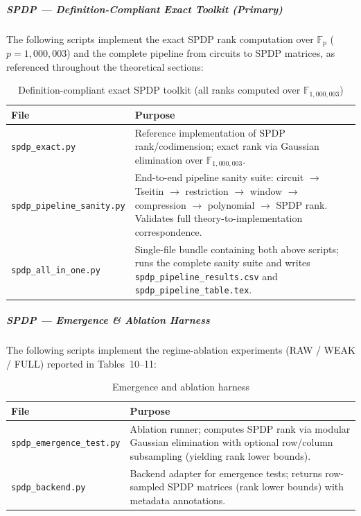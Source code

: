 \documentclass[12pt]{article}
\theoremstyle{definition}
\theoremstyle{definition}
\theoremstyle{remark}
\theoremstyle{remark}
\begin{document}
\subparagraph{SPDP --- Definition-Compliant Exact Toolkit (Primary)}
The following scripts implement the exact SPDP rank computation over $\mathbb{F}_p$ ($p = 1{,}000{,}003$) and the complete pipeline from circuits to SPDP matrices, as referenced throughout the theoretical sections:

\begin{table}[h]
\centering
\footnotesize
\begin{tabular}{p{4cm}p{9.5cm}}
\toprule
\textbf{File} & \textbf{Purpose} \\
\midrule
\texttt{spdp\_exact.py} & Reference implementation of SPDP rank/codimension; exact rank via Gaussian elimination over $\mathbb{F}_{1{,}000{,}003}$. \\
\addlinespace
\texttt{spdp\_pipeline\_sanity.py} & End-to-end pipeline sanity suite: circuit $\to$ Tseitin $\to$ restriction $\to$ window $\to$ compression $\to$ polynomial $\to$ SPDP rank. Validates full theory-to-implementation correspondence. \\
\addlinespace
\texttt{spdp\_all\_in\_one.py} & Single-file bundle containing both above scripts; runs the complete sanity suite and writes \texttt{spdp\_pipeline\_results.csv} and \texttt{spdp\_pipeline\_table.tex}. \\
\bottomrule
\end{tabular}
\caption{Definition-compliant exact SPDP toolkit (all ranks computed over $\mathbb{F}_{1{,}000{,}003}$)}
\label{tab:spdp-exact-toolkit}
\end{table}

\subparagraph{SPDP --- Emergence \& Ablation Harness}
The following scripts implement the regime-ablation experiments (RAW / WEAK / FULL) reported in Tables~10--11:

\begin{table}[h]
\centering
\footnotesize
\begin{tabular}{p{4cm}p{9.5cm}}
\toprule
\textbf{File} & \textbf{Purpose} \\
\midrule
\texttt{spdp\_emergence\_test.py} & Ablation runner; computes SPDP rank via modular Gaussian elimination with optional row/column subsampling (yielding rank lower bounds). \\
\addlinespace
\texttt{spdp\_backend.py} & Backend adapter for emergence tests; returns row-sampled SPDP matrices (rank lower bounds) with metadata annotations. \\
\bottomrule
\end{tabular}
\caption{Emergence and ablation harness}
\label{tab:spdp-emergence}
\end{table}
\end{document}
